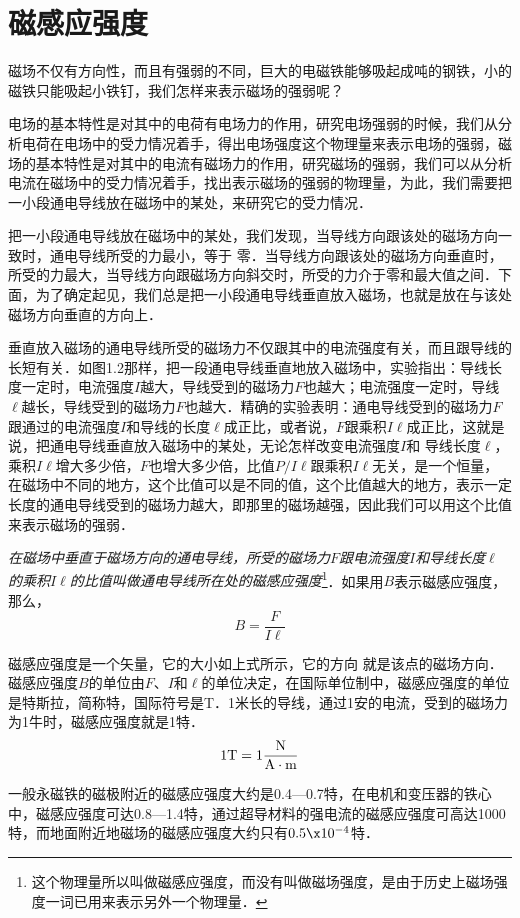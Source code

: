 \section{磁感应强度}
磁场不仅有方向性，而且有强弱的不同，巨大的电磁铁能够吸起成吨的钢铁，小的磁铁只能吸起小铁钉，我们怎样来表示磁场的强弱呢？

电场的基本特性是对其中的电荷有电场力的作用，研究电场强弱的时候，我们从分析电荷在电场中的受力情况着手，得出电场强度这个物理量来表示电场的强弱，磁场的基本特性是对其中的电流有磁场力的作用，研究磁场的强弱，我们可以从分析电流在磁场中的受力情况着手，找出表示磁场的强弱的物理量，为此，我们需要把一小段通电导线放在磁场中的某处，来研究它的受力情况．

把一小段通电导线放在磁场中的某处，我们发现，当导线方向跟该处的磁场方向一致时，通电导线所受的力最小，等于
零．当导线方向跟该处的磁场方向垂直时，所受的力最大，当导线方向跟磁场方向斜交时，所受的力介于零和最大值之间．下面，为了确定起见，我们总是把一小段通电导线垂直放入磁场，也就是放在与该处磁场方向垂直的方向上．

垂直放入磁场的通电导线所受的磁场力不仅跟其中的电流强度有关，而且跟导线的长短有关．如图1.2那样，把一段通电导线垂直地放入磁场中，实验指出：导线长度一定时，电流强度$I$越大，导线受到的磁场力$F$也越大；电流强度一定时，导线$\ell$越长，导线受到的磁场力$F$也越大．精确的实验表明：通电导线受到的磁场力$F$跟通过的电流强度$I$和导线的长度$\ell$成正比，或者说，$F$跟乘积$I\ell$成正比，这就是说，把通电导线垂直放入磁场中的某处，无论怎样改变电流强度$I$和
导线长度$\ell$，乘积$I\ell$增大多少倍，$F$也增大多少倍，比值$P/I\ell$跟乘积$I\ell$无关，是一个恒量，在磁场中不同的地方，这个比值可以是不同的值，这个比值越大的地方，表示一定长度的通电导线受到的磁场力越大，即那里的磁场越强，因此我们可以用这个比值来表示磁场的强弱．

\textit{在磁场中垂直于磁场方向的通电导线，所受的磁场力$F$跟电流强度$I$和导线长度$\ell$的乘积$I\ell$的比值叫做通电导线所在处的磁感应强度}\footnote{这个物理量所以叫做磁感应强度，而没有叫做磁场强度，是由于历史上磁场强度一词已用来表示另外一个物理量．}．如果用$B$表示磁感应强度，那么，
\[B=\frac{F}{I\ell}\]

磁感应强度是一个矢量，它的大小如上式所示，它的方向
就是该点的磁场方向．磁感应强度$B$的单位由$F$、$I$和$\ell$的单位决定，在国际单位制中，磁感应强度的单位是特斯拉，简称特，国际符号是T．1米长的导线，通过1安的电流，受到的磁场力为1牛时，磁感应强度就是1特．
\[1{\rm T}=1\frac{\rm N}{\rm A\cdot m}\]

一般永磁铁的磁极附近的磁感应强度大约是0.4—0.7特，在电机和变压器的铁心中，磁感应强度可达0.8—1.4特，通过超导材料的强电流的磁感应强度可高达1000特，而地面附近地磁场的磁感应强度大约只有$0.5\x 10^{-4}$特．

